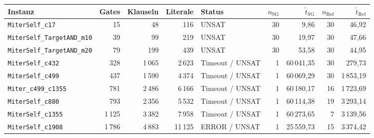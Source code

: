 \begin{tabular}{lrrrlrrrr}
\toprule
Instanz & Gates & Klauseln & Literale & Status & $n_{\mathrm{SG}}$ & $\tilde{t}_{\mathrm{SG}}$ & $n_{\mathrm{Ref}}$ & $\tilde{t}_{\mathrm{Ref}}$ \\
\midrule
\texttt{MiterSelf\_c17} & 15 & 48 & 116 & UNSAT & 30 & 9{,}86 & 30 & 46{,}92 \\
\texttt{MiterSelf\_TargetAND\_m10} & 39 & 99 & 219 & UNSAT & 30 & 19{,}97 & 30 & 47{,}66 \\
\texttt{MiterSelf\_TargetAND\_m20} & 79 & 199 & 439 & UNSAT & 30 & 53{,}58 & 30 & 44{,}95 \\
\texttt{MiterSelf\_c432} & 328 & 1\,065 & 2\,623 & Timeout / UNSAT & 1 & 60\,041{,}35 & 30 & 279{,}73 \\
\texttt{MiterSelf\_c499} & 437 & 1\,590 & 4\,374 & Timeout / UNSAT & 1 & 60\,069{,}29 & 30 & 1\,853{,}19 \\
\texttt{Miter\_c499\_c1355} & 781 & 2\,486 & 6\,166 & Timeout / UNSAT & 1 & 60\,180{,}17 & 16 & 1\,723{,}69 \\
\texttt{MiterSelf\_c880} & 793 & 2\,356 & 5\,532 & Timeout / UNSAT & 1 & 60\,114{,}38 & 19 & 3\,293{,}14 \\
\texttt{MiterSelf\_c1355} & 1\,125 & 3\,382 & 7\,958 & Timeout / UNSAT & 1 & 60\,273{,}65 & 7 & 3\,139{,}56 \\
\texttt{MiterSelf\_c1908} & 1\,786 & 4\,883 & 11\,125 & ERROR / UNSAT & 1 & 25\,559{,}73 & 15 & 3\,374{,}42 \\
\bottomrule
\end{tabular}
